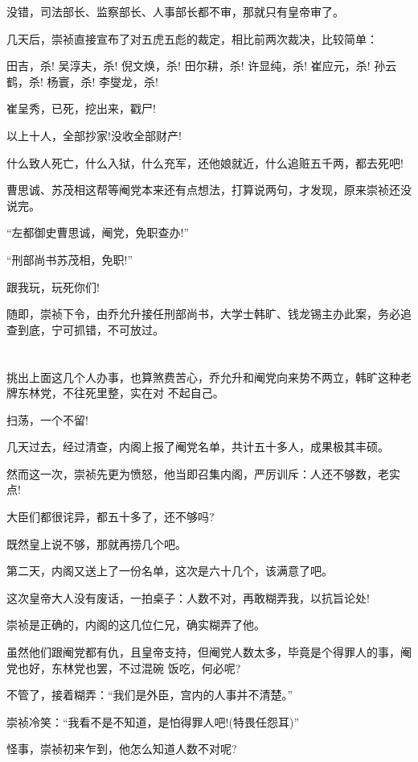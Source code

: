 \documentclass[11pt,a4paper,onecolumn]{article}
\begin{document}
没错，司法部长、监察部长、人事部长都不审，那就只有皇帝审了。

几天后，崇祯直接宣布了对五虎五彪的裁定，相比前两次裁决，比较简单：

田吉，杀! 吴淳夫，杀! 倪文焕，杀! 田尔耕，杀! 许显纯，杀! 崔应元，杀! 孙云鹤，杀! 杨寰，杀! 李燮龙，杀!

崔呈秀，已死，挖出来，戳尸!

以上十人，全部抄家!没收全部财产!

什么致人死亡，什么入狱，什么充军，还他娘就近，什么追赃五千两，都去死吧!

曹思诚、苏茂相这帮等阉党本来还有点想法，打算说两句，才发现，原来崇祯还没说完。

``左都御史曹思诚，阉党，免职查办!''

``刑部尚书苏茂相，免职!''

跟我玩，玩死你们!

随即，崇祯下令，由乔允升接任刑部尚书，大学士韩旷、钱龙锡主办此案，务必追查到底，宁可抓错，不可放过。

\section[\thesection]{}

挑出上面这几个人办事，也算煞费苦心，乔允升和阉党向来势不两立，韩旷这种老牌东林党，不往死里整，实在对
不起自己。

扫荡，一个不留!

几天过去，经过清查，内阁上报了阉党名单，共计五十多人，成果极其丰硕。

然而这一次，崇祯先更为愤怒，他当即召集内阁，严厉训斥：人还不够数，老实点!

大臣们都很诧异，都五十多了，还不够吗?

既然皇上说不够，那就再捞几个吧。

第二天，内阁又送上了一份名单，这次是六十几个，该满意了吧。

这次皇帝大人没有废话，一拍桌子：人数不对，再敢糊弄我，以抗旨论处!

崇祯是正确的，内阁的这几位仁兄，确实糊弄了他。

虽然他们跟阉党都有仇，且皇帝支持，但阉党人数太多，毕竟是个得罪人的事，阉党也好，东林党也罢，不过混碗
饭吃，何必呢?

不管了，接着糊弄：``我们是外臣，宫内的人事并不清楚。''

崇祯冷笑：``我看不是不知道，是怕得罪人吧!(特畏任怨耳)''

怪事，崇祯初来乍到，他怎么知道人数不对呢?
\end{document}
